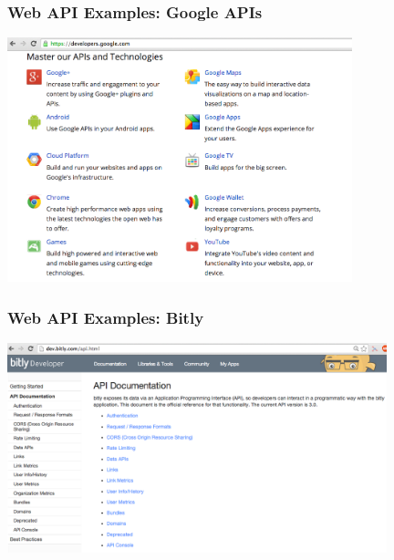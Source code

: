 \documentclass{beamer}\usepackage[]{graphicx}\usepackage[]{color}
\begin{document}

\begin{frame}
\frametitle{Web API Examples: Google APIs}

\begin{center}
\includegraphics[width=10cm]{images/google_apis.png}
\end{center}

\end{frame}


\begin{frame}
\frametitle{Web API Examples: Bitly}

\begin{center}
\includegraphics[width=11cm]{images/bitly_api.png}
\end{center}

\end{frame}

\end{document}
